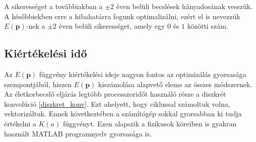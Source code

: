 \documentclass[12pt]{article}
\begin{document}
A sikerességet a továbbiakban a $\pm 2$ éven belüli becslések hányadosának vesszük. A későbbiekben erre a hibahatárra fogunk optimalizálni, ezért el is nevezzük $E(\mathbf{p})$-nek a $\pm 2$ éven belüli sikerességet, amely egy $0$ és $1$ közötti szám.
\subsection{Kiértékelési idő}
Az $E(\mathbf{p})$ függvény kiértékelési ideje nagyon fontos az optimizálás gyorsasága szempontjából, hiszen $E(\mathbf{p})$ kiszámolása alapvető eleme az összes módszernek. Az életkorbecslő eljárás legtöbb processzoridőt használó része a diszkrét konvolúció \eqref{diszkret_konv}. Ezt ahelyett, hogy ciklussal számoltuk volna, vektorizáltuk. Ennek következtében a számítógép sokkal gyorsabban ki tudja értékelni a $K(a)$ függvényt. Ezen alapszik a fizikusok köreiben is gyakran használt MATLAB programnyelv gyorsasága is. %
\end{document}
